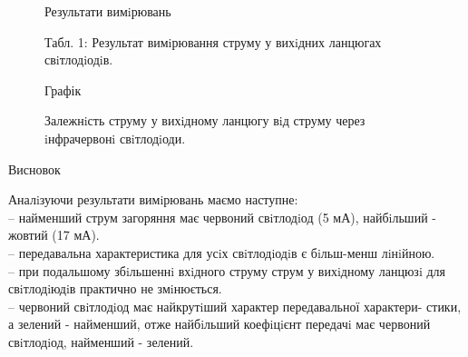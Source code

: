 \documentclass[a4paper,14pt]{extreport}
\begin{document}
\begin{figure}[h]
\begin{center}
Результати вимiрювань 
\end{center}
\caption{ Табл. 1: Результат вимiрювання струму у вихiдних ланцюгах свiтлодiодiв.}
	\label{ris2}
\end{figure}

\begin{figure}[h]
\begin{center}
Графік
\end{center}
	\caption{ Залежнiсть струму у вихiдному ланцюгу вiд струму через iнфрачервонi свiтлодiоди.}
	\label{ris1}
\end{figure}

\clearpage
\begin{center}
Висновок
\end{center}

Аналiзуючи результати вимiрювань маємо наступне:\\ 

-- найменший струм загоряння має червоний свiтлодiод (5 мА), найбiльший -
жовтий (17 мА).\\

-- передавальна характеристика для усiх свiтлодiодiв є бiльш-менш лiнiйною.\\ 

-- при подальшому збiльшеннi вхiдного струму струм у вихiдному ланцюзi для
свiтлодiюдiв практично не змiнюється.\\ 

-- червоний свiтлодiод має найкрутiший характер передавальної характери-
стики, а зелений - найменший, отже найбiльший коефiцiєнт передачi має
червоний свiтлодiод, найменший - зелений.
\end{document}
